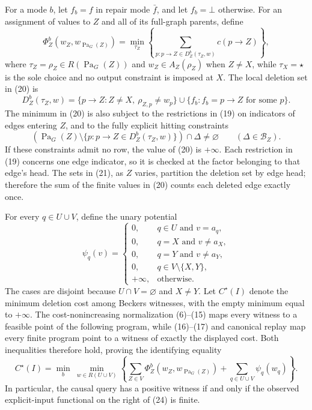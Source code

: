 For a mode \(b\), let \(f_b=f\) in repair mode \(\bar f\), and let \(f_b=\bot\) otherwise.  For an assignment of values to \(Z\) and all of its full-graph parents, define
\[
 \Phi_Z^b(w_Z,w_{\operatorname{Pa}_G(Z)})
 =
 \min_{\tau_Z}
 \left\{
  \sum_{p:p\to Z\in D_Z^b(\tau_Z,w)}c(p\to Z)
 \right\},                                                            \tag{20}
\]
where \(\tau_Z=\rho_Z\in R(\operatorname{Pa}_G(Z))\) and \(w_Z\in A_Z(\rho_Z)\) when \(Z\ne X\), while \(\tau_X=\star\) is the sole choice and no output constraint is imposed at \(X\).  The local deletion set in (20) is
\[
 D_Z^b(\tau_Z,w)
 =\{p\to Z:Z\ne X,\ \rho_{Z,p}\ne w_p\}
  \cup\{f_b:f_b=p\to Z\text{ for some \(p\)}\}.                     \tag{21}
\]
The minimum in (20) is also subject to the restrictions in (19) on indicators of edges entering \(Z\), and to the fully explicit hitting constraints
\[
 \left(\operatorname{Pa}_G(Z)
 \setminus\{p:p\to Z\in D_Z^b(\tau_Z,w)\}\right)
 \cap\Delta\ne\varnothing
 \qquad(\Delta\in\mathcal B_Z).                                     \tag{22}
\]
If these constraints admit no row, the value of (20) is \(+\infty\).  Each restriction in (19) concerns one edge indicator, so it is checked at the factor belonging to that edge's head.  The sets in (21), as \(Z\) varies, partition the deletion set by edge head; therefore the sum of the finite values in (20) counts each deleted edge exactly once.

For every \(q\in U\cup V\), define the unary potential
\[
 \psi_q(v)=
 \begin{cases}
  0,&q\in U\text{ and }v=a_q,\\
  0,&q=X\text{ and }v\ne a_X,\\
  0,&q=Y\text{ and }v\ne a_Y,\\
  0,&q\in V\setminus\{X,Y\},\\
  +\infty,&\text{otherwise}.
 \end{cases}                                                          \tag{23}
\]
The cases are disjoint because \(U\cap V=\varnothing\) and \(X\ne Y\).  Let \(C^\star(I)\) denote the minimum deletion cost among Beckers witnesses, with the empty minimum equal to \(+\infty\).  The cost-nonincreasing normalization (6)--(15) maps every witness to a feasible point of the following program, while (16)--(17) and canonical replay map every finite program point to a witness of exactly the displayed cost.  Both inequalities therefore hold, proving the identifying equality
\[
 C^\star(I)
 =
 \min_b\ \min_{w\in R(U\cup V)}
 \left\{
  \sum_{Z\in V}\Phi_Z^b(w_Z,w_{\operatorname{Pa}_G(Z)})
  +\sum_{q\in U\cup V}\psi_q(w_q)
 \right\}.                                                           \tag{24}
\]
In particular, the causal query has a positive witness if and only if the observed explicit-input functional on the right of (24) is finite.

